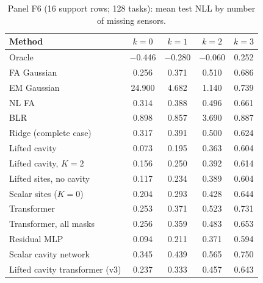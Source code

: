 \begin{table}[t]
\centering\small
\caption{\label{tab:moreF6}Panel F6 (16 support rows; 128 tasks): mean test NLL by number of missing sensors.}
\begin{tabular}{lcccc}
\toprule
Method & $k{=}0$ & $k{=}1$ & $k{=}2$ & $k{=}3$\\
\midrule
Oracle & $-$0.446 & $-$0.280 & $-$0.060 & 0.252\\
FA Gaussian & 0.256 & 0.371 & 0.510 & 0.686\\
EM Gaussian & 24.900 & 4.682 & 1.140 & 0.739\\
NL FA & 0.314 & 0.388 & 0.496 & 0.661\\
BLR & 0.898 & 0.857 & 3.690 & 0.887\\
Ridge (complete case) & 0.317 & 0.391 & 0.500 & 0.624\\
Lifted cavity & 0.073 & 0.195 & 0.363 & 0.604\\
Lifted cavity, $K=2$ & 0.156 & 0.250 & 0.392 & 0.614\\
Lifted sites, no cavity & 0.117 & 0.234 & 0.389 & 0.604\\
Scalar sites ($K=0$) & 0.204 & 0.293 & 0.428 & 0.644\\
Transformer & 0.253 & 0.371 & 0.523 & 0.731\\
Transformer, all masks & 0.256 & 0.359 & 0.483 & 0.653\\
Residual MLP & 0.094 & 0.211 & 0.371 & 0.594\\
Scalar cavity network & 0.345 & 0.439 & 0.565 & 0.750\\
Lifted cavity transformer (v3) & 0.237 & 0.333 & 0.457 & 0.643\\
\bottomrule
\end{tabular}
\end{table}


